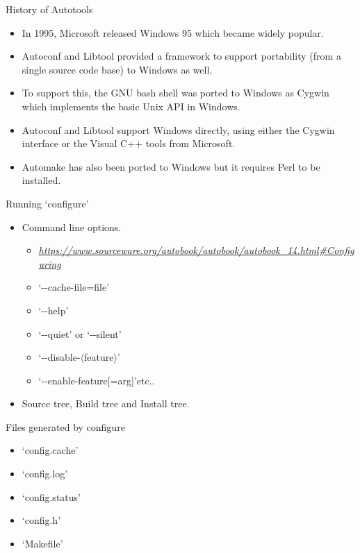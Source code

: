 \documentclass{beamer}
\begin{document}
\begin{frame}{History of Autotools}
\begin{itemize}
	\item In 1995, Microsoft released Windows 95 which became widely popular.\pause
	\item Autoconf and Libtool provided a framework to support portability (from a single source code base) to Windows as well.\pause
	\item To support this, the GNU bash shell was ported to Windows as Cygwin which implements the basic Unix API in Windows. \pause
	\item Autoconf and Libtool support Windows directly, using either the Cygwin interface or the Visual C++ tools from Microsoft.\pause
	\item Automake has also been ported to Windows but it requires Perl to be installed.
\end{itemize}
\end{frame}

\begin{frame}{Running `configure'}
\begin{itemize}
	\item Command line options.
	\begin{itemize}
		\item \emph{\tiny{\href{https://www.sourceware.org/autobook/autobook/autobook\_14.html\#Configuring}{https://www.sourceware.org/autobook/autobook/autobook\_14.html\#Configuring}}}\pause
		\item `-\hspace*{0.01cm}-cache-file=file' \pause
		\item `-\hspace*{0.01cm}-help' \pause
		\item `-\hspace*{0.01cm}-quiet' or `-\hspace*{0.01cm}-silent' \pause
		\item `-\hspace*{0.01cm}-disable-$\langle$feature$\rangle$' \pause	
		\item `-\hspace*{0.01cm}-enable-feature[=arg]'etc..
	\end{itemize}
	\item Source tree, Build tree and Install tree.
\end{itemize}
\end{frame}

\begin{frame}{Files generated by configure}
\begin{itemize}
	\item `config.cache'\pause
	\item `config.log'\pause
	\item `config.status'\pause
	\item `config.h'\pause
	\item `Makefile'\pause
\end{itemize}
\end{frame}
\end{document}
